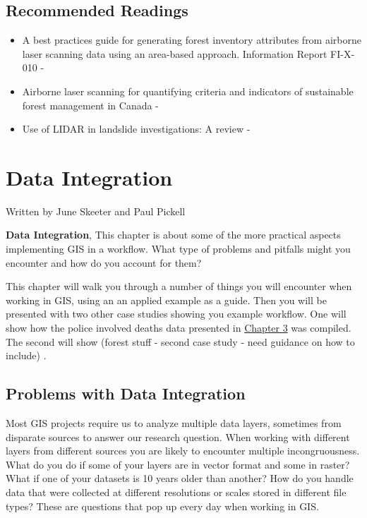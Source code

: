\documentclass[
]{book}
\providecommand{\tightlist}{%
  \setlength{\itemsep}{0pt}\setlength{\parskip}{0pt}}
\begin{document}
\hypertarget{recommended-readings-1}{%
\section*{Recommended Readings}\label{recommended-readings-1}}

\begin{itemize}
\tightlist
\item
  A best practices guide for generating forest inventory attributes from airborne laser scanning data using an area-based approach. Information Report FI-X-010 - \citet{white_best_2013}
\item
  Airborne laser scanning for quantifying criteria and indicators of sustainable forest management in Canada - \citet{goodbody_airborne_2021}
\item
  Use of LIDAR in landslide investigations: A review - \citet{jaboyedoff_use_2012}
\end{itemize}

\hypertarget{data-integration}{%
\chapter{Data Integration}\label{data-integration}}

Written by
June Skeeter and Paul Pickell

\textbf{Data Integration}, This chapter is about some of the more practical aspects implementing GIS in a workflow. What type of problems and pitfalls might you encounter and how do you account for them?

This chapter will walk you through a number of things you will encounter when working in GIS, using an an applied example as a guide. Then you will be presented with two other case studies showing you example workflow. One will show how the police involved deaths data presented in \href{./types-of-data.html}{Chapter 3} was compiled. The second will show (forest stuff - second case study - need guidance on how to include) \citep{skeeter_controls_2022}.

\hypertarget{problems-with-data-integration}{%
\section{Problems with Data Integration}\label{problems-with-data-integration}}

Most GIS projects require us to analyze multiple data layers, sometimes from disparate sources to answer our research question. When working with different layers from different sources you are likely to encounter multiple incongruousness. What do you do if some of your layers are in vector format and some in raster? What if one of your datasets is 10 years older than another? How do you handle data that were collected at different resolutions or scales stored in different file types? These are questions that pop up every day when working in GIS.
\end{document}
